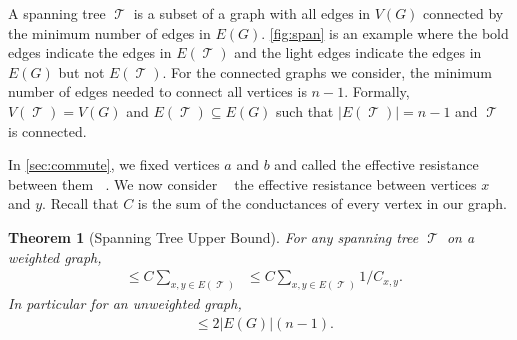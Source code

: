 \documentclass[12pt]{article}
\newtheorem{theorem}{Theorem}
\theoremstyle{definition}
\DeclareMathOperator{\tcov}{t_\textrm{cov}}      %
\DeclareMathOperator{\Reff}{R_{\textrm{eff}}}    %
\DeclareMathOperator{\Rxy}{R_{\textrm{x,y}}}     %
\DeclareMathOperator{\T}{\mathcal{T}}            %
\begin{document}
A spanning tree $\T$ is a subset of a graph with all edges
in $V(G)$ connected by the minimum number of edges in $E(G)$.
\cref{fig:span} is an example where the bold edges indicate the edges in $E(\T)$
and the light edges indicate the edges in $E(G)$ but not $E(\T)$.
For the connected graphs we consider, the minimum number of edges
needed to connect all vertices is $n-1$.
Formally, $V(\T) = V(G)$ and $E(\T) \subseteq E(G)$
such that $|E(\T)| = n-1$ and $\T$ is connected.


In \cref{sec:commute}, we fixed vertices $a$ and $b$ and called
the effective resistance between them $\Reff$.
We now consider $\Rxy$ the effective resistance between vertices $x$ and $y$.
Recall that $C$ is the sum of the conductances of every vertex in our graph.

\begin{theorem}[Spanning Tree Upper Bound] \label{thm:span}
For any spanning tree $\T$ on a weighted graph,
\begin{align}
\tcov \leq C \sum_{x,y \in E(\T)} \Rxy \leq C \sum_{x,y \in E(\T)} 1 / C_{x,y}. \nonumber
\end{align}
In particular for an unweighted graph,
\begin{align}
\tcov \leq 2 |E(G)| (n-1). \nonumber 
\end{align}
\end{theorem}
\end{document}
